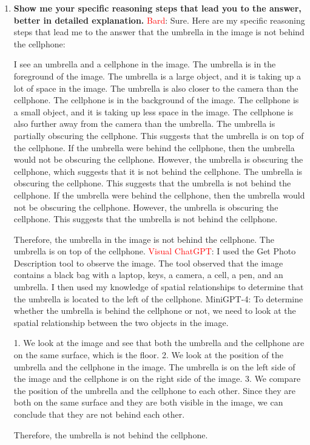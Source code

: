 \begin{enumerate}
    Therefore, the umbrella in the image is not behind the cellphone. The umbrella is on top of the cellphone.
    \subitem \textcolor{red}{Visual ChatGPT}: The umbrella is not behind the cellphone. It is located to the left of the cellphone.
    \subitem MiniGPT-4: No, the umbrella is not behind the cellphone. They are both on the same surface, which is the floor, and they are both visible in the image.
    \item \textbf{Show me your specific reasoning steps that lead you to the answer, better in detailed explanation.}
    \subitem \textcolor{Red}{Bard}: Sure. Here are my specific reasoning steps that lead me to the answer that the umbrella in the image is not behind the cellphone:

    I see an umbrella and a cellphone in the image.
    The umbrella is in the foreground of the image. The umbrella is a large object, and it is taking up a lot of space in the image. The umbrella is also closer to the camera than the cellphone.
    The cellphone is in the background of the image. The cellphone is a small object, and it is taking up less space in the image. The cellphone is also further away from the camera than the umbrella.
    The umbrella is partially obscuring the cellphone. This suggests that the umbrella is on top of the cellphone.
    If the umbrella were behind the cellphone, then the umbrella would not be obscuring the cellphone. However, the umbrella is obscuring the cellphone, which suggests that it is not behind the cellphone.
    The umbrella is obscuring the cellphone. This suggests that the umbrella is not behind the cellphone. If the umbrella were behind the cellphone, then the umbrella would not be obscuring the cellphone. However, the umbrella is obscuring the cellphone. This suggests that the umbrella is not behind the cellphone.
    
    Therefore, the umbrella in the image is not behind the cellphone. The umbrella is on top of the cellphone.
    \subitem \textcolor{red}{Visual ChatGPT}: I used the Get Photo Description tool to observe the image. The tool observed that the image contains a black bag with a laptop, keys, a camera, a cell, a pen, and an umbrella. I then used my knowledge of spatial relationships to determine that the umbrella is located to the left of the cellphone.
    \subitem MiniGPT-4: To determine whether the umbrella is behind the cellphone or not, we need to look at the spatial relationship between the two objects in the image.

    1. We look at the image and see that both the umbrella and the cellphone are on the same surface, which is the floor.
    2. We look at the position of the umbrella and the cellphone in the image. The umbrella is on the left side of the image and the cellphone is on the right side of the image.
    3. We compare the position of the umbrella and the cellphone to each other. Since they are both on the same surface and they are both visible in the image, we can conclude that they are not behind each other.
    
    Therefore, the umbrella is not behind the cellphone.
\end{enumerate}
